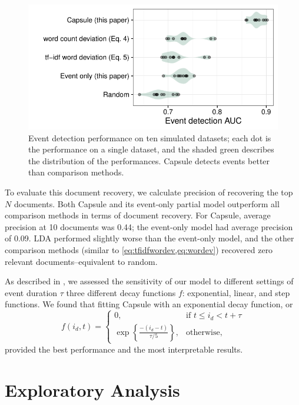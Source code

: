 \begin{figure}[ht]
\centering
\includegraphics[width=\linewidth]{fig/sim_eventdetect.pdf}
\caption{Event detection performance on ten simulated datasets; each dot is the performance on a single dataset, and the shaded green describes the distribution of the performances.  Capsule detects events better than comparison methods.}
\label{fig:sim_eventdetect}
\end{figure}

To evaluate this document recovery, we calculate precision of
recovering the top $N$ documents.  Both Capsule and its event-only
partial model outperform all comparison methods in terms of document
recovery.  For Capsule, average precision at 10 documents was 0.44;
the event-only model had average precision of 0.09.  LDA performed
slightly worse than the event-only model, and the other comparison
methods (similar to \cref{eq:tfidfwordev,eq:wordev}) recovered zero relevant
documents--equivalent to random.


As described in , we assessed the sensitivity of our model to different settings of event duration $\tau$ three different decay functions $f$: exponential, linear, and step functions.  We found that fitting Capsule with an exponential decay function, or
\begin{equation}
f(i_d, t) =
\begin{cases}
    0,			& \text{if } t \le i_d < t + \tau\\
    \exp\left\{\frac{-(i_d - t)}{\tau/5}\right\},          & \text{otherwise,}
\end{cases}
\label{eq:f}
\end{equation}
provided the best performance and the most interpretable results.



\section{Exploratory Analysis}
\label{sec:eval}

